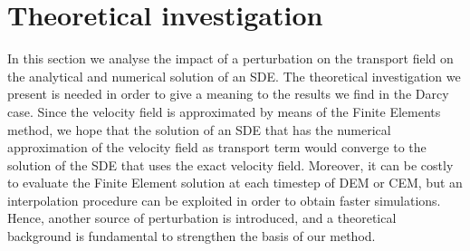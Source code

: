 \section{Theoretical investigation}
In this section we analyse the impact of a perturbation on the transport field on the analytical and numerical solution of an SDE. The theoretical investigation we present is needed in order to give a meaning to the results we find in the Darcy case. Since the velocity field is approximated by means of the Finite Elements method, we hope that the solution of an SDE that has the numerical approximation of the velocity field as transport term would converge to the solution of the SDE that uses the exact velocity field. Moreover, it can be costly to evaluate the Finite Element solution at each timestep of DEM or CEM, but an interpolation procedure can be exploited in order to obtain faster simulations. Hence, another source of perturbation is introduced, and a theoretical background is fundamental to strengthen the basis of our method.

